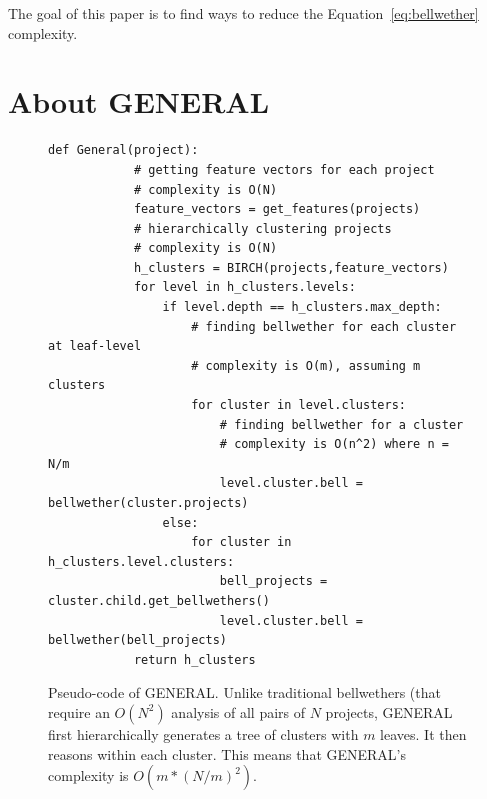 \documentclass[10pt,journal,compsoc]{IEEEtran}
\begin{document}
The goal of this paper is to find ways to reduce the Equation~\ref{eq:bellwether} complexity.




 
\section{About GENERAL}
\label{GENERAL}

\begin{figure}[!b]
    \small
     \begin{lstlisting}[mathescape,numbers=right,frame=None]
        def General(project):
            # getting feature vectors for each project
            # complexity is O(N)
            feature_vectors = get_features(projects)
            # hierarchically clustering projects
            # complexity is O(N)
            h_clusters = BIRCH(projects,feature_vectors)
            for level in h_clusters.levels:
                if level.depth == h_clusters.max_depth:
                    # finding bellwether for each cluster at leaf-level
                    # complexity is O(m), assuming m clusters
                    for cluster in level.clusters:
                        # finding bellwether for a cluster
                        # complexity is O(n^2) where n = N/m
                        level.cluster.bell = bellwether(cluster.projects)
                else:
                    for cluster in h_clusters.level.clusters:
                        bell_projects = cluster.child.get_bellwethers()
                        level.cluster.bell = bellwether(bell_projects)
            return h_clusters   

            \end{lstlisting} 
            \vspace{-0.2cm}
            \caption{Pseudo-code of GENERAL. Unlike traditional bellwethers (that require an $O(N^2)$ analysis of all pairs of $N$ projects, GENERAL first hierarchically generates a tree of  clusters with $m$ leaves. It  then reasons  within each cluster. This means  that GENERAL's complexity is $O(m*(N/m)^2)$.}
            \label{fig:Pseudo-code} 
            \vspace{-0.3cm}
\end{figure}
\end{document}
